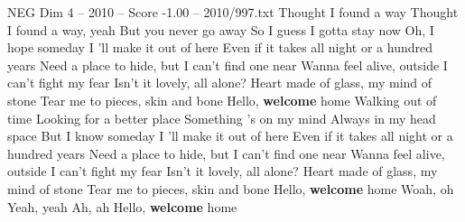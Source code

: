 \begin{textsample}{NEG Dim 4 – 2010 – Score -1.00 – 2010/997.txt}  \label{ex:f4_neg_001}
Thought I found a way Thought I found a way, yeah But you never go away So I guess I gotta stay now Oh, I hope someday I 'll make it out of here Even if it takes all night or a hundred years Need a place to hide, but I can't find one near Wanna feel alive, outside I can't fight my fear Isn't it lovely, all alone?
Heart made of glass, my mind of stone Tear me to pieces, skin and bone Hello, \textbf{welcome} home Walking out of time Looking for a better place Something 's on my mind Always in my head space But I know someday I 'll make it out of here Even if it takes all night or a hundred years Need a place to hide, but I can't find one near Wanna feel alive, outside I can't fight my fear Isn't it lovely, all alone?
Heart made of glass, my mind of stone Tear me to pieces, skin and bone Hello, \textbf{welcome} home Woah, oh Yeah, yeah Ah, ah Hello, \textbf{welcome} home

\end{textsample}

